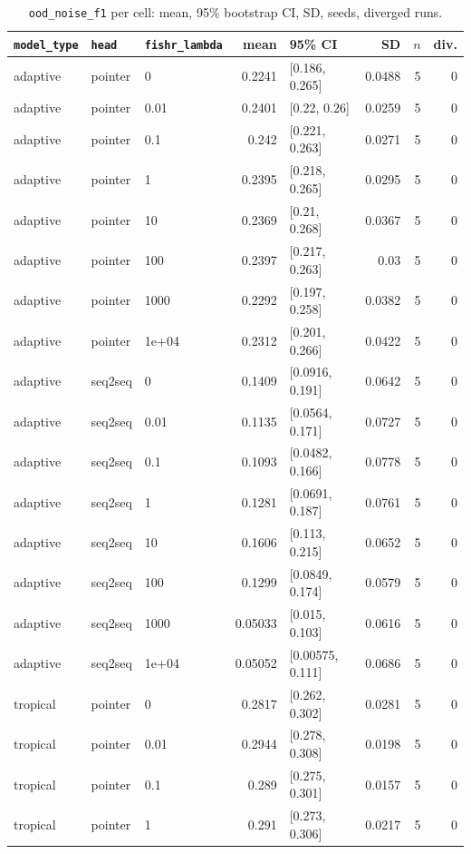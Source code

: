 \documentclass[10pt]{article}
\begin{document}
{\small
\begin{longtable}{lllrlrrr}
\caption{\texttt{ood\_noise\_f1} per cell: mean, 95\% bootstrap CI, SD, seeds, diverged runs.}\label{tab:summary-ood_noise_f1}\\
\toprule
\texttt{model\_type} & \texttt{head} & \texttt{fishr\_lambda} & mean & 95\% CI & SD & $n$ & div.\\
\midrule
\endhead
adaptive & pointer & 0 & 0.2241 & [0.186, 0.265] & 0.0488 & 5 & 0\\
adaptive & pointer & 0.01 & 0.2401 & [0.22, 0.26] & 0.0259 & 5 & 0\\
adaptive & pointer & 0.1 & 0.242 & [0.221, 0.263] & 0.0271 & 5 & 0\\
adaptive & pointer & 1 & 0.2395 & [0.218, 0.265] & 0.0295 & 5 & 0\\
adaptive & pointer & 10 & 0.2369 & [0.21, 0.268] & 0.0367 & 5 & 0\\
adaptive & pointer & 100 & 0.2397 & [0.217, 0.263] & 0.03 & 5 & 0\\
adaptive & pointer & 1000 & 0.2292 & [0.197, 0.258] & 0.0382 & 5 & 0\\
adaptive & pointer & 1e+04 & 0.2312 & [0.201, 0.266] & 0.0422 & 5 & 0\\
adaptive & seq2seq & 0 & 0.1409 & [0.0916, 0.191] & 0.0642 & 5 & 0\\
adaptive & seq2seq & 0.01 & 0.1135 & [0.0564, 0.171] & 0.0727 & 5 & 0\\
adaptive & seq2seq & 0.1 & 0.1093 & [0.0482, 0.166] & 0.0778 & 5 & 0\\
adaptive & seq2seq & 1 & 0.1281 & [0.0691, 0.187] & 0.0761 & 5 & 0\\
adaptive & seq2seq & 10 & 0.1606 & [0.113, 0.215] & 0.0652 & 5 & 0\\
adaptive & seq2seq & 100 & 0.1299 & [0.0849, 0.174] & 0.0579 & 5 & 0\\
adaptive & seq2seq & 1000 & 0.05033 & [0.015, 0.103] & 0.0616 & 5 & 0\\
adaptive & seq2seq & 1e+04 & 0.05052 & [0.00575, 0.111] & 0.0686 & 5 & 0\\
tropical & pointer & 0 & 0.2817 & [0.262, 0.302] & 0.0281 & 5 & 0\\
tropical & pointer & 0.01 & 0.2944 & [0.278, 0.308] & 0.0198 & 5 & 0\\
tropical & pointer & 0.1 & 0.289 & [0.275, 0.301] & 0.0157 & 5 & 0\\
tropical & pointer & 1 & 0.291 & [0.273, 0.306] & 0.0217 & 5 & 0\\

\end{longtable}}
\end{document}
